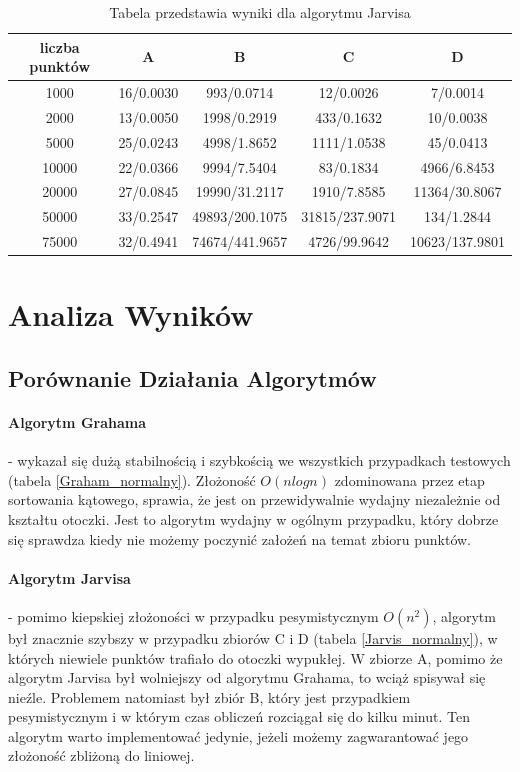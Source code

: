 \documentclass[12pt, a4paper]{article}
\begin{document}
\begin{table}[h]
    \centering
    \begin{tabular}{|c||c|c|c|c|}
        \hline
        liczba punktów & A & B & C & D \\
        \hline\hline
        1000 & 16/0.0030 & 993/0.0714 & 12/0.0026 & 7/0.0014\\
        \hline
        2000 & 13/0.0050 & 1998/0.2919 & 433/0.1632 & 10/0.0038\\
        \hline
        5000 & 25/0.0243 & 4998/1.8652 & 1111/1.0538 & 45/0.0413\\
        \hline
        10000 & 22/0.0366 & 9994/7.5404 & 83/0.1834 & 4966/6.8453\\
        \hline
        20000 & 27/0.0845 & 19990/31.2117 & 1910/7.8585 & 11364/30.8067\\
        \hline
        50000 & 33/0.2547 & 49893/200.1075 & 31815/237.9071 & 134/1.2844\\
        \hline
        75000 & 32/0.4941 & 74674/441.9657 & 4726/99.9642 & 10623/137.9801\\
        \hline 
    \end{tabular}
    \caption{Tabela przedstawia wyniki dla algorytmu Jarvisa}
    \label{Jarvis_zepsuty}
\end{table}

\section{Analiza Wyników}
\subsection{Porównanie Działania Algorytmów}
\paragraph{Algorytm Grahama} - wykazał się dużą stabilnością i szybkością we wszystkich przypadkach testowych (tabela \ref{Graham_normalny}). Złożoność $O(nlogn)$
zdominowana przez etap sortowania kątowego, sprawia, że jest on przewidywalnie wydajny niezależnie od kształtu otoczki. Jest to
algorytm wydajny w ogólnym przypadku, który dobrze się sprawdza kiedy nie możemy poczynić założeń na temat zbioru punktów.

\paragraph{Algorytm Jarvisa} - pomimo kiepskiej złożoności w przypadku pesymistycznym $O(n^{2})$, algorytm był znacznie szybszy
w przypadku zbiorów C i D (tabela \ref{Jarvis_normalny}), w których niewiele punktów trafiało do otoczki wypukłej. W zbiorze A, pomimo że algorytm Jarvisa był
wolniejszy od algorytmu Grahama, to wciąż spisywał się nieźle. Problemem natomiast był zbiór B, który jest przypadkiem pesymistycznym
i w którym czas obliczeń rozciągał się do kilku minut. Ten algorytm warto implementować jedynie, jeżeli możemy zagwarantować
jego złożoność zbliżoną do liniowej.
\end{document}
